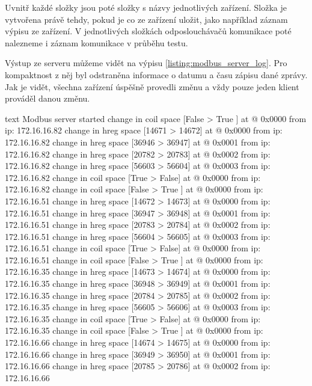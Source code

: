 Uvnitř každé složky jsou poté složky s názvy jednotlivých zařízení. Složka je vytvořena právě tehdy, pokud je co ze zařízení uložit, jako například záznam výpisu ze zařízení. V jednotlivých složkách odposlouchávačů komunikace poté nalezneme i záznam komunikace v průběhu testu. 

Výstup ze serveru můžeme vidět na výpisu \ref{listing:modbus_server_log}. Pro kompaktnost z něj byl odstraněna informace o datumu a času zápisu dané zprávy. Jak je vidět, všechna zařízení úspěšně provedli změnu a vždy pouze jeden klient prováděl danou změnu.

\begin{listing}[htbp]
    \centering
    \begin{cminted}[breaklines,autogobble, fontsize=\footnotesize]{text}
        Modbus server started
        change in coil space [False > True ] at @ 0x0000 from ip: 172.16.16.82   
        change in hreg space [14671 > 14672] at @ 0x0000 from ip: 172.16.16.82   
        change in hreg space [36946 > 36947] at @ 0x0001 from ip: 172.16.16.82   
        change in hreg space [20782 > 20783] at @ 0x0002 from ip: 172.16.16.82   
        change in hreg space [56603 > 56604] at @ 0x0003 from ip: 172.16.16.82   
        change in coil space [True  > False] at @ 0x0000 from ip: 172.16.16.82   
        change in coil space [False > True ] at @ 0x0000 from ip: 172.16.16.51   
        change in hreg space [14672 > 14673] at @ 0x0000 from ip: 172.16.16.51   
        change in hreg space [36947 > 36948] at @ 0x0001 from ip: 172.16.16.51   
        change in hreg space [20783 > 20784] at @ 0x0002 from ip: 172.16.16.51   
        change in hreg space [56604 > 56605] at @ 0x0003 from ip: 172.16.16.51   
        change in coil space [True  > False] at @ 0x0000 from ip: 172.16.16.51   
        change in coil space [False > True ] at @ 0x0000 from ip: 172.16.16.35   
        change in hreg space [14673 > 14674] at @ 0x0000 from ip: 172.16.16.35   
        change in hreg space [36948 > 36949] at @ 0x0001 from ip: 172.16.16.35   
        change in hreg space [20784 > 20785] at @ 0x0002 from ip: 172.16.16.35   
        change in hreg space [56605 > 56606] at @ 0x0003 from ip: 172.16.16.35   
        change in coil space [True  > False] at @ 0x0000 from ip: 172.16.16.35   
        change in coil space [False > True ] at @ 0x0000 from ip: 172.16.16.66   
        change in hreg space [14674 > 14675] at @ 0x0000 from ip: 172.16.16.66   
        change in hreg space [36949 > 36950] at @ 0x0001 from ip: 172.16.16.66   
        change in hreg space [20785 > 20786] at @ 0x0002 from ip: 172.16.16.66   

\end{cminted}
\end{listing}
